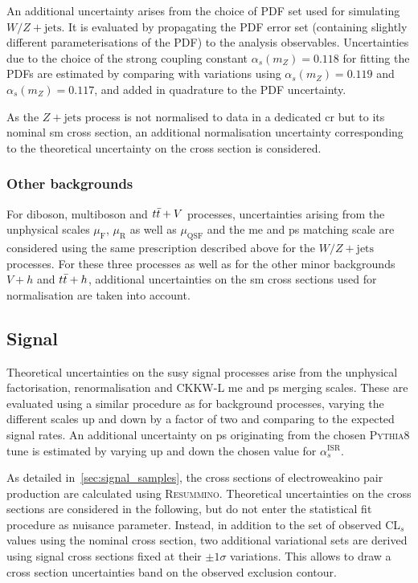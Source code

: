 An additional uncertainty arises from the choice of \gls{PDF} set used for simulating $W/Z+\mathrm{jets}$.
 It is evaluated by propagating the \gls{PDF} error set (containing slightly different parameterisations of the \gls{PDF}) to the analysis observables.
 Uncertainties due to the choice of the strong coupling constant $\alpha_s(m_Z) = 0.118$ for fitting the \glspl{PDF} are estimated by comparing with variations using $\alpha_s(m_Z) = 0.119$ and $\alpha_s(m_Z) = 0.117$, and added in quadrature to the \gls{PDF} uncertainty.
 
 As the $Z+\mathrm{jets}$ process is not normalised to data in a dedicated \gls{cr} but to its nominal \gls{sm} cross section, an additional normalisation uncertainty corresponding to the theoretical uncertainty on the cross section is considered.
  
 \subsubsection{Other backgrounds}
 
 For diboson, multiboson and $t\bar{t}+V$ processes, uncertainties arising from the unphysical scales $\mu_\mathrm{F}$, $\mu_\mathrm{R}$ as well as $\mu_\mathrm{QSF}$ and the \gls{me} and \gls{ps} matching scale are considered using the same prescription described above for the $W/Z+\mathrm{jets}$ processes.
 For these three processes as well as for the other minor backgrounds $V+h$ and $t\bar{t}+h$, additional uncertainties on the \gls{sm} cross sections used for normalisation are taken into account.
  
 \subsection{Signal}\label{sec:signal_theory_uncertainties}
 
 Theoretical uncertainties on the \gls{susy} signal processes arise from the unphysical factorisation, renormalisation and CKKW-L \gls{me} and \gls{ps} merging scales.
 These are evaluated using a similar procedure as for background processes, varying the different scales up and down by a factor of two and comparing to the expected signal rates.
 An additional uncertainty on \gls{ps} originating from the chosen \textsc{Pythia8} tune is estimated by varying up and down the chosen value for $\alpha_s^\mathrm{ISR}$.
 
 As detailed in~\cref{sec:signal_samples}, the cross sections of electroweakino pair production are calculated using \textsc{Resummino}. Theoretical uncertainties on the cross sections are considered in the following, but do not enter the statistical fit procedure as nuisance parameter.
 Instead, in addition to the set of observed CL$_s$ values using the nominal cross section, two additional variational sets are derived using signal cross sections fixed at their $\pm 1\sigma$ variations.
 This allows to draw a cross section uncertainties band on the observed exclusion contour. 

